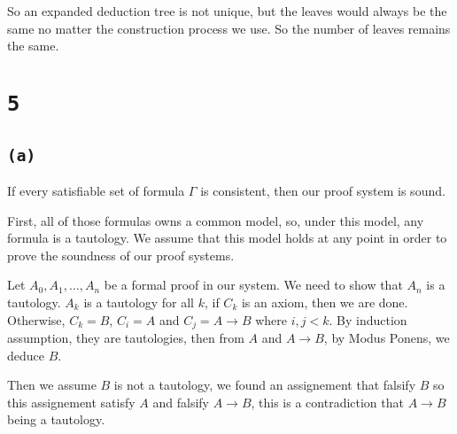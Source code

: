 \documentclass[a4paper,11pt]{report}
\begin{document}
So an expanded deduction tree is not unique, but the leaves would always be the
same no matter the construction process we use. So the number of leaves remains
the same.

\section*{\texttt{5}}

\subsection*{\texttt{(a)}}

If every satisfiable set of formula $\Gamma$ is consistent, then our proof system is
sound.

First, all of those formulas owns a common model, so, under this model, any
formula is a tautology. We assume that this model holds at any point in order to
prove the soundness of our proof systems.

Let $A_0,A_1,\dots,A_n$ be a formal proof in our system. We need to show that
$A_n$ is a tautology. $A_k$ is a tautology for all $k$, if $C_k$ is an axiom,
then we are done. Otherwise, $C_k = B$, $C_i = A$ and $C_j = A \to B$ where $i,j
< k$. By induction assumption, they are tautologies, then from $A$ and $A \to
B$, by Modus Ponens, we deduce $B$.

Then we assume $B$ is not a tautology, we found an assignement that falsify $B$
so this assignement satisfy $A$ and falsify $A \to B$, this is a contradiction
that $A \to B$  being a tautology.
\end{document}
